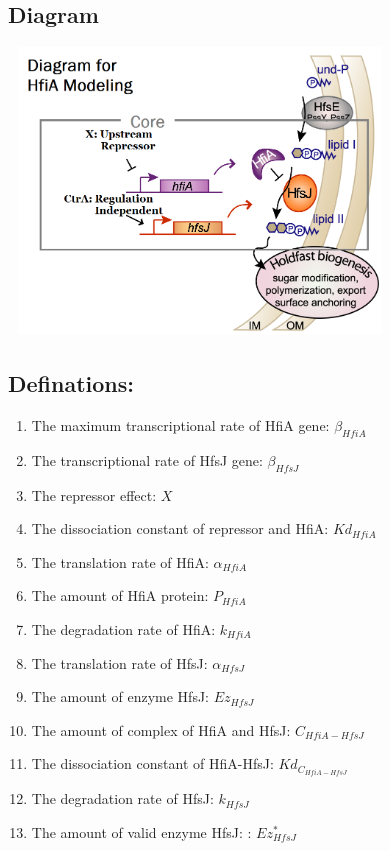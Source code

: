 \documentclass[UTF8]{ctexart}
\begin{document}
    \subsection{Diagram}
            \includegraphics[width=4.00in, height=3.00in]{HfiA.png}
    \subsection{Definations:}
        \begin{enumerate}
        \item The maximum transcriptional rate of HfiA gene: $\beta_{HfiA}$
        \item The transcriptional rate of HfsJ gene: $\beta_{HfsJ}$
        \item The repressor effect: $X$
        \item The dissociation constant of repressor and HfiA: $Kd_{HfiA}$
        \item The translation rate of HfiA: $\alpha_{HfiA}$
        \item The amount of HfiA protein: $P_{HfiA}$
        \item The degradation rate of HfiA: $k_{HfiA}$
        \item The translation rate of HfsJ: $\alpha_{HfsJ}$
        \item The amount of enzyme HfsJ: $Ez_{HfsJ}$
        \item The amount of complex of HfiA and HfsJ: $C_{HfiA-HfsJ}$
        \item The dissociation constant of HfiA-HfsJ: $Kd_{C_{HfiA-HfsJ}}$
        \item The degradation rate of HfsJ: $k_{HfsJ}$
        \item The amount of valid enzyme HfsJ: : $Ez^{*}_{HfsJ}$
        \end{enumerate}
\end{document}
